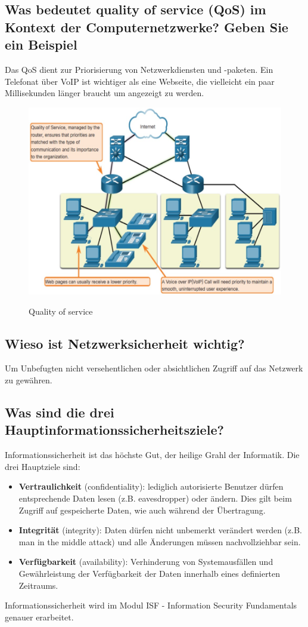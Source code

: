 \subsection*{Was bedeutet \flqq quality of service (QoS)\frqq{} im Kontext der Computernetzwerke? Geben Sie ein Beispiel}
Das QoS dient zur Priorisierung von Netzwerkdiensten und -paketen. Ein Telefonat über VoIP ist wichtiger als eine Webseite, die vielleicht ein paar Millisekunden länger braucht um angezeigt zu werden.
\begin{figure}[H]
    \begin{center}
    \label{pic:qos}
    \includegraphics[width=\textwidth]{images/qos.jpg}
    \caption{Quality of service}
    \end{center}
\end{figure}

\subsection*{Wieso ist Netzwerksicherheit wichtig?}
Um Unbefugten nicht versehentlichen oder absichtlichen Zugriff auf das Netzwerk zu gewähren.

\subsection*{Was sind die drei Hauptinformationssicherheitsziele?}
Informationssicherheit ist das höchste Gut, der heilige Grahl der Informatik. Die drei Hauptziele sind:
\begin{itemize}
    \item \textbf{Vertraulichkeit} (confidentiality): lediglich autorisierte Benutzer dürfen entsprechende Daten lesen (z.B. eavesdropper) oder ändern. Dies gilt beim Zugriff auf gespeicherte Daten, wie auch während der Übertragung.
    \item \textbf{Integrität} (integrity): Daten dürfen nicht unbemerkt verändert werden (z.B. man in the middle attack) und alle Änderungen müssen nachvollziehbar sein.
    \item \textbf{Verfügbarkeit} (availability): Verhinderung von Systemausfällen und Gewährleistung der Verfügbarkeit der Daten innerhalb eines definierten Zeitraums.
\end{itemize}
Informationssicherheit wird im Modul ISF - Information Security Fundamentals genauer erarbeitet.


